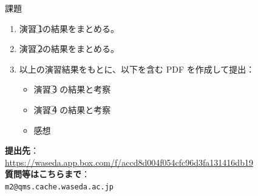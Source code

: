 \documentclass{beamer}
\begin{document}
    \begin{frame}{課題}
    
        \begin{enumerate}
          \item 演習\,\textcircled{1}の結果をまとめる。
          \item 演習\,\textcircled{2}の結果をまとめる。
          \item 以上の演習結果をもとに、以下を含む PDF を作成して提出：
          \begin{itemize}
            \item 演習\,\textcircled{3} の結果と考察
            \item 演習\,\textcircled{4} の結果と考察
            \item 感想
          \end{itemize}
        \end{enumerate}
        
        \textbf{提出先}：\\
        \url{https://waseda.app.box.com/f/accd8d004f054cfc96d3fa131416db19} \\
        
        \textbf{質問等はこちらまで}：\\
        \texttt{m2@qms.cache.waseda.ac.jp}
    
    \end{frame}
  
\end{document}

